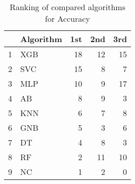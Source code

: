 \begin{table}
\footnotesize
\caption{Ranking of compared algorithms for Accuracy}
\label{tab:places Accuracy}
\begin{tabular}{llrrr}
\hline
 & Algorithm & 1st & 2nd & 3rd \\
\hline
1 & XGB & 18 & 12 & 15 \\
2 & SVC & 15 & 8 & 7 \\
3 & MLP & 10 & 9 & 17 \\
4 & AB & 8 & 9 & 3 \\
5 & KNN & 6 & 7 & 8 \\
6 & GNB & 5 & 3 & 6 \\
7 & DT & 4 & 8 & 3 \\
8 & RF & 2 & 11 & 10 \\
9 & NC & 1 & 2 & 0 \\
\hline
\end{tabular}
\end{table}
